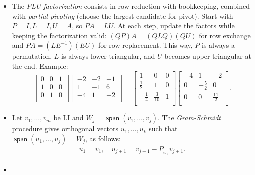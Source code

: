 \documentclass[11pt]{article}
\newcommand{\1}{\mathbf{1}}
\newcommand{\proj}[1]{P_{\!\!{}_{#1}\,}}
\newcommand{\0}{\mathbf{0}}
\DeclareMathOperator{\myspan}{\mathsf{span}}
\begin{document}
\begin{itemize}

\item

The
\emph{PLU factorization}
consists in row reduction with bookkeeping, combined with \emph{partial pivoting} (choose the largest candidate for pivot).
Start with $P = I, L = I, U=A$, so $PA = LU$.
At each step, update the factors while keeping the factorization valid:
$(QP)A = (QLQ)(QU)$
for row exchange and
$PA = (LE^{-1})(EU)$
for row replacement.
This way, $P$ is always a permutation, $L$ is always lower triangular, and $U$ becomes upper triangular at the end.
Example:
\[
\begin{bmatrix}
  0	&  0	&  1 \\
  1	&  0	&  0 \\
  0	&  1	&  0 \\
\end{bmatrix}
\begin{bmatrix}
-2	& -2	& -1 \\
 1	& -1	&  6 \\
-4	&  1	& -2 \\
\end{bmatrix}
=
\begin{bmatrix}
  1	&  0	&  0 \\
\frac{1}{2}& 1	&  0 \\
-\frac{1}{4}& \frac{3}{10}& 1 \\
\end{bmatrix}
\begin{bmatrix}
-4& 1& -2 \\
0& -\frac{5}{2}& 0 \\
0& 0& \frac{11}{2} \\
\end{bmatrix}
.
\]


\item

Let $v_1,\dots,v_m$ be LI and $W_j = \myspan(v_1,\dots,v_j)$.
The \emph{Gram-Schmidt} procedure gives orthogonal vectors $u_1,\dots,u_k$ such that $\myspan(u_1,\dots,u_j)=W_j$, as follows:
\begin{align*}
u_1 = v_1, \quad u_{j+1} = v_{j+1} - \proj{W_j} v_{j+1}.
\end{align*}

\item


\end{itemize}
\end{document}
